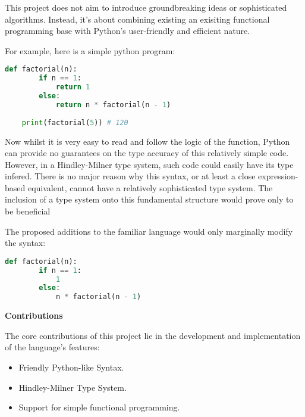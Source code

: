 \documentclass{l4proj}
\begin{document}
This project does not aim to introduce groundbreaking ideas or sophisticated algorithms. 
Instead, it's about combining existing an exisiting functional programming base with Python's user-friendly and efficient nature.

For example, here is a simple python program:
\begin{lstlisting}[language=Python, caption=A simple python program to find the factorial of a given number (n).]
    def factorial(n):
        if n == 1:
            return 1
        else:
            return n * factorial(n - 1)
    
    print(factorial(5)) # 120
\end{lstlisting}

Now whilst it is very easy to read and follow the logic of the function, Python can provide no guarantees on the type accuracy of this relatively simple code.
However, in a Hindley-Milner type system, such code could easily have its type infered.
There is no major reason why this syntax, or at least a close expression-based equivalent, cannot have a relatively sophisticated type system.
The inclusion of a type system onto this fundamental structure would prove only to be beneficial

The proposed additions to the familiar language would only marginally modify the syntax:

\begin{lstlisting}[language=Python, caption=A proposed PyFunc program to find the factorial of a given numbe (n).]
    def factorial(n):
        if n == 1:
            1
        else:
            n * factorial(n - 1)
\end{lstlisting}



\textbf{Contributions}

The core contributions of this project lie in the development and implementation of the language’s features:

\begin{itemize}
    \item Friendly Python-like Syntax.
    \item Hindley-Milner Type System.
    \item Support for simple functional programming.
\end{itemize}
\end{document}
